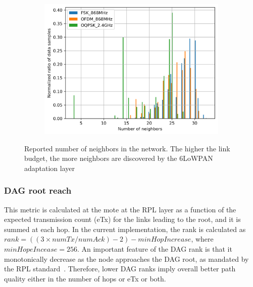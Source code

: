 \documentclass[journal,article,submit,moreauthors,pdftex]{Definitions/mdpi}
\begin{document}
\begin{figure}
\begin{subfigure}{0.6\columnwidth}
		\centering
	\includegraphics[width=1\columnwidth]{neighbors_pdf}
	\label{fig:neighbors_pdf}
	\end{subfigure}%

	\caption{Reported number of neighbors in the network. The higher the link budget, the more neighbors are discovered by the 6LoWPAN adaptation layer} 
	\label{fig:neighbors_all}
\end{figure}

\subsubsection{DAG root reach}
\label{sec:dagroot}


This metric is calculated at the mote at the RPL layer as a function of the expected transmission count (eTx) for the links leading to the root, and it is summed at each hop.
In the current implementation, the rank is calculated as $rank = ((3\times numTx/numAck)-2)-minHopIncrease$, where $minHopeIncease = 256$. 
An important feature of the DAG rank is that it monotonically decrease as  the node approaches the DAG root, as mandated by the RPL standard~\cite{rfc6550}.
Therefore, lower DAG ranks imply overall better path quality either in the number of hops or eTx or both. 

\end{document}
